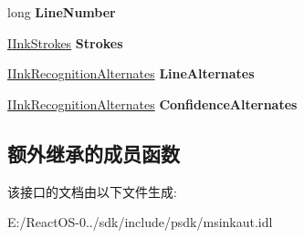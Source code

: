\begin{DoxyCompactItemize}
\item 
\mbox{\label{interface_m_s_i_n_k_a_u_t_lib_1_1_i_ink_recognition_alternate_aedab4b2b0ed74707d95489fc0e650931}} 
long {\bfseries Line\+Number}
\item 
\mbox{\label{interface_m_s_i_n_k_a_u_t_lib_1_1_i_ink_recognition_alternate_a2203c963b35f6f5eb4c78573657509f1}} 
\hyperlink{interface_m_s_i_n_k_a_u_t_lib_1_1_i_ink_strokes}{I\+Ink\+Strokes} {\bfseries Strokes}
\item 
\mbox{\label{interface_m_s_i_n_k_a_u_t_lib_1_1_i_ink_recognition_alternate_a0f4ddd598434da42083323d48f25159a}} 
\hyperlink{interface_m_s_i_n_k_a_u_t_lib_1_1_i_ink_recognition_alternates}{I\+Ink\+Recognition\+Alternates} {\bfseries Line\+Alternates}
\item 
\mbox{\label{interface_m_s_i_n_k_a_u_t_lib_1_1_i_ink_recognition_alternate_ad5f5272beecc3f2cf4bcc9f1efffa0e9}} 
\hyperlink{interface_m_s_i_n_k_a_u_t_lib_1_1_i_ink_recognition_alternates}{I\+Ink\+Recognition\+Alternates} {\bfseries Confidence\+Alternates}
\end{DoxyCompactItemize}
\subsection*{额外继承的成员函数}


该接口的文档由以下文件生成\+:\begin{DoxyCompactItemize}
\item 
E\+:/\+React\+O\+S-\/0../sdk/include/psdk/msinkaut.\+idl\end{DoxyCompactItemize}
